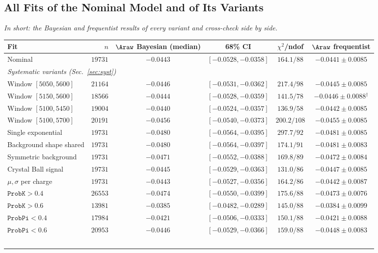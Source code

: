 \subsection{All Fits of the Nominal Model and of Its Variants}
\label{sec:syst_tables}
\emph{In short: the Bayesian and frequentist results of every variant and cross-check side by side.}
\begin{table}[t]
\centering
\begin{tabular}{lrccc|c}
\toprule
Fit & $n$ & $\Araw$ Bayesian (median) & 68\% CI & $\chi^2$/ndof & $\Araw$ frequentist \\
\midrule
Nominal & $19731$ & $-0.0443$ & $[-0.0528,-0.0358]$ & $164.1/88$ & $-0.0441\pm0.0085$ \\
\multicolumn{6}{l}{\emph{Systematic variants (Sec.~\ref{sec:syst})}} \\
Window $[5050,5600]$ & $21164$ & $-0.0446$ & $[-0.0531,-0.0362]$ & $217.4/98$ & $-0.0445\pm0.0085$ \\
Window $[5150,5600]$ & $18566$ & $-0.0444$ & $[-0.0528,-0.0359]$ & $141.5/78$ & $-0.0446\pm0.0088$$^\dagger$ \\
Window $[5100,5450]$ & $19004$ & $-0.0440$ & $[-0.0524,-0.0357]$ & $136.9/58$ & $-0.0442\pm0.0085$ \\
Window $[5100,5700]$ & $20191$ & $-0.0456$ & $[-0.0540,-0.0373]$ & $200.2/108$ & $-0.0455\pm0.0085$ \\
Single exponential & $19731$ & $-0.0480$ & $[-0.0564,-0.0395]$ & $297.7/92$ & $-0.0481\pm0.0085$ \\
Background shape shared & $19731$ & $-0.0480$ & $[-0.0564,-0.0397]$ & $174.1/91$ & $-0.0481\pm0.0083$ \\
Symmetric background & $19731$ & $-0.0471$ & $[-0.0552,-0.0388]$ & $169.8/89$ & $-0.0472\pm0.0084$ \\
Crystal Ball signal & $19731$ & $-0.0445$ & $[-0.0529,-0.0363]$ & $131.0/86$ & $-0.0447\pm0.0085$ \\
$\mu,\sigma$ per charge & $19731$ & $-0.0443$ & $[-0.0527,-0.0356]$ & $164.2/86$ & $-0.0442\pm0.0087$ \\
$\texttt{ProbK}>0.4$ & $26553$ & $-0.0474$ & $[-0.0550,-0.0399]$ & $175.6/88$ & $-0.0473\pm0.0076$ \\
$\texttt{ProbK}>0.6$ & $13981$ & $-0.0385$ & $[-0.0482,-0.0289]$ & $145.0/88$ & $-0.0384\pm0.0099$ \\
$\texttt{ProbPi}<0.4$ & $17984$ & $-0.0421$ & $[-0.0506,-0.0333]$ & $150.1/88$ & $-0.0421\pm0.0088$ \\
$\texttt{ProbPi}<0.6$ & $20953$ & $-0.0446$ & $[-0.0529,-0.0366]$ & $159.0/88$ & $-0.0448\pm0.0083$ \\
$$
\end{tabular}
\end{table}
